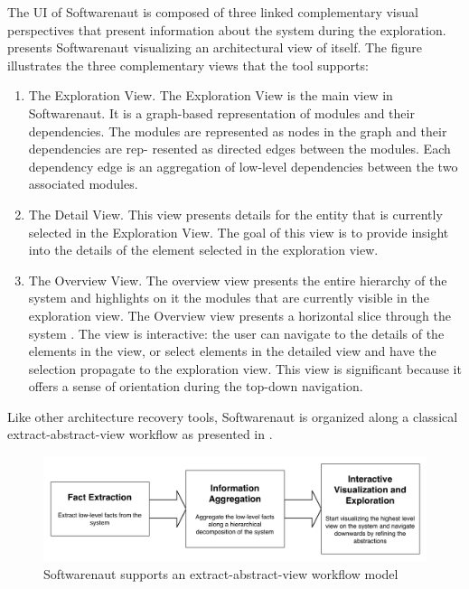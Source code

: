 \documentclass[preprint,12pt]{elsarticle}
\begin{document}
The UI of Softwarenaut is composed of three linked complementary visual perspectives that present information about the system during the exploration.  presents Softwarenaut visualizing an architectural view of itself. The figure illustrates the three complementary views that the tool supports:

\begin{enumerate}
\item The Exploration View. The Exploration View is the main view in Softwarenaut. It is a graph-based representation of modules and their dependencies. The modules are represented as nodes in the graph and their dependencies are rep- resented as directed edges between the modules. Each dependency edge is an aggregation of low-level dependencies between the two associated modules.
\item The Detail View. This view presents details for the entity that is currently selected in the Exploration View. The goal of this view is to provide insight into the details of the element selected in the exploration view.
\item The Overview View. The overview view presents the entire hierarchy of the system and highlights on it the modules that are currently visible in the exploration view. The Overview view presents a horizontal slice through the system \cite{wong-thesis}. The view is interactive: the user can navigate to the details of the elements in the view, or select elements in the detailed view and have the selection propagate to the exploration view. This view is significant because it offers a sense of orientation during the top-down navigation.
\end{enumerate}


Like other architecture recovery tools, Softwarenaut is organized along a classical extract-abstract-view workflow as presented in .

\begin{figure}[h]
\begin{center}
\includegraphics[width=\linewidth]{images/SnautFlow}
\caption{Softwarenaut supports an extract-abstract-view workflow model}
\end{center}
\end{figure}
\end{document}
